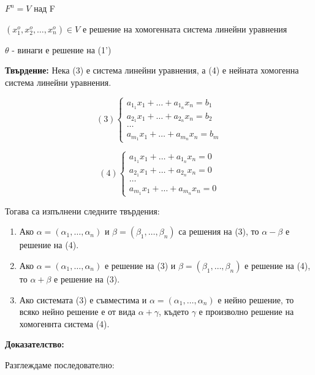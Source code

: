 \documentclass[fleqn,12pt]{article}
\begin{document}
\begin{flushleft}
$ F^n = V $ над F

$ ( x_1^o, x_2^o, \dots, x_n^o ) \in V $ е решение на хомогенната система линейни уравнения

$ \theta $ - винаги е решение на (1')

\vspace{5mm}

\textbf{Твърдение: } Нека (3) е система линейни уравнения, а (4) е нейната хомогенна система линейни уравнения.


\begin{equation*}
    (3)\begin{cases}
        a_{1_1}x_1+\dots+a_{1_n}x_n = b_1\\
        a_{2_1}x_1+\dots+a_{2_n}x_n = b_2\\
        \dots\\
        a_{m_1}x_1+\dots+a_{m_n}x_n = b_m
    \end{cases}
\end{equation*}

\begin{equation*}
    (4)\begin{cases}
        a_{1_1}x_1+\dots+a_{1_n}x_n = 0\\
        a_{2_1}x_1+\dots+a_{2_n}x_n = 0\\
        \dots\\
        a_{m_1}x_1+\dots+a_{m_n}x_n = 0
    \end{cases}
\end{equation*}

Тогава са изпълнени следните твърдения:

\begin{enumerate}
    \item Ако $\alpha = (\alpha_1, \dots, \alpha_n)$ и $\beta = (\beta_1, \dots, \beta_n)$ са решения на (3), то $\alpha - \beta$ е решение на (4).
    \item Ако $\alpha = (\alpha_1, \dots, \alpha_n)$ е решение на (3) и $\beta = (\beta_1, \dots, \beta_n)$ е решение на (4), то $\alpha + \beta$ е решение на (3).
    \item Ако системата (3) е съвместима и $\alpha = (\alpha_1, \dots, \alpha_n)$ е нейно решение, то всяко нейно решение е от вида $\alpha + \gamma$, където $\gamma$ е произволно решение на хомогеннта система (4).
\end{enumerate}

\textbf{Доказателство:}

Разглеждаме последователно:


\end{flushleft}
\end{document}
